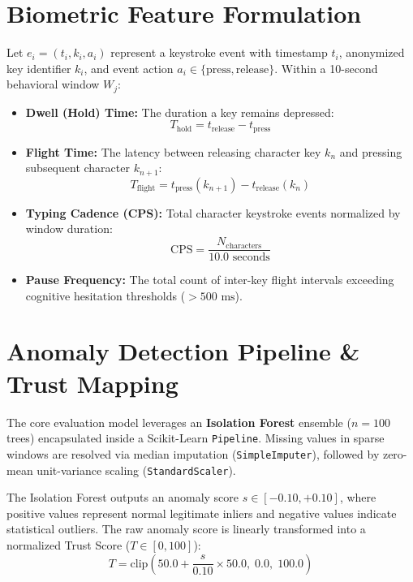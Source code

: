 \documentclass[12pt, a4paper, oneside]{report}
\begin{document}
\section{Biometric Feature Formulation}
Let $e_i = (t_i, k_i, a_i)$ represent a keystroke event with timestamp $t_i$, anonymized key identifier $k_i$, and event action $a_i \in \{\text{press}, \text{release}\}$. Within a 10-second behavioral window $W_j$:
\begin{itemize}
    \item \textbf{Dwell (Hold) Time:} The duration a key remains depressed:
    \begin{equation}
        T_{\text{hold}} = t_{\text{release}} - t_{\text{press}}
    \end{equation}
    \item \textbf{Flight Time:} The latency between releasing character key $k_n$ and pressing subsequent character $k_{n+1}$:
    \begin{equation}
        T_{\text{flight}} = t_{\text{press}}(k_{n+1}) - t_{\text{release}}(k_n)
    \end{equation}
    \item \textbf{Typing Cadence (CPS):} Total character keystroke events normalized by window duration:
    \begin{equation}
        \text{CPS} = \frac{N_{\text{characters}}}{10.0\text{ seconds}}
    \end{equation}
    \item \textbf{Pause Frequency:} The total count of inter-key flight intervals exceeding cognitive hesitation thresholds ($>500\text{ ms}$).
\end{itemize}

\section{Anomaly Detection Pipeline \& Trust Mapping}
The core evaluation model leverages an \textbf{Isolation Forest} ensemble ($n=100$ trees) encapsulated inside a Scikit-Learn \texttt{Pipeline}. Missing values in sparse windows are resolved via median imputation (\texttt{SimpleImputer}), followed by zero-mean unit-variance scaling (\texttt{StandardScaler}).

The Isolation Forest outputs an anomaly score $s \in [-0.10, +0.10]$, where positive values represent normal legitimate inliers and negative values indicate statistical outliers. The raw anomaly score is linearly transformed into a normalized Trust Score ($T \in [0, 100]$):
\begin{equation}
    T = \text{clip}\left(50.0 + \frac{s}{0.10} \times 50.0, \; 0.0, \; 100.0\right)
\end{equation}
\end{document}
